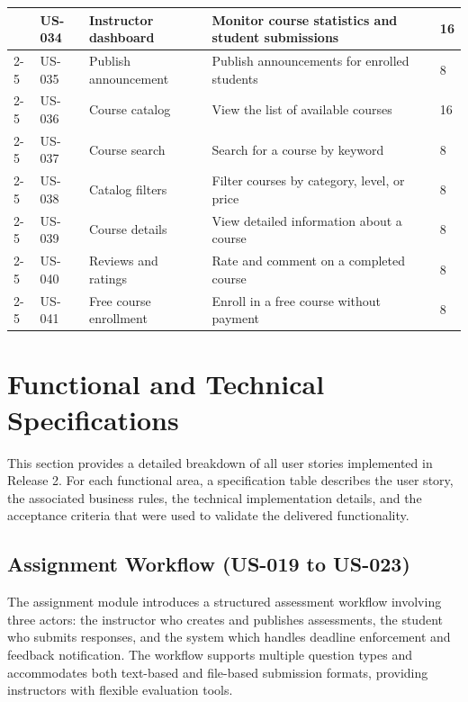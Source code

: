 \begin{table}[H]
\begin{tabularx}{\textwidth}{|p{1.4cm}|p{1.5cm}|p{2.8cm}|p{6.8cm}|p{1.5cm}|}
  & US-034 & Instructor dashboard & Monitor course statistics and student submissions & 16 \\
  \cline{2-5}
  & US-035 & Publish announcement & Publish announcements for enrolled students & 8 \\
  \cline{2-5}
  & US-036 & Course catalog & View the list of available courses & 16 \\
  \cline{2-5}
  & US-037 & Course search & Search for a course by keyword & 8 \\
  \cline{2-5}
  & US-038 & Catalog filters & Filter courses by category, level, or price & 8 \\
  \cline{2-5}
  & US-039 & Course details & View detailed information about a course & 8 \\
  \cline{2-5}
  & US-040 & Reviews and ratings & Rate and comment on a completed course & 8 \\
  \cline{2-5}
  & US-041 & Free course enrollment & Enroll in a free course without payment & 8 \\
\hline
\end{tabularx}
\end{table}

\section{Functional and Technical Specifications}

This section provides a detailed breakdown of all user stories implemented in Release 2.
For each functional area, a specification table describes the user story, the associated
business rules, the technical implementation details, and the acceptance criteria that
were used to validate the delivered functionality.

\subsection{Assignment Workflow (US-019 to US-023)}

The assignment module introduces a structured assessment workflow involving three
actors: the instructor who creates and publishes assessments, the student who submits
responses, and the system which handles deadline enforcement and feedback notification.
The workflow supports multiple question types and accommodates both text-based and
file-based submission formats, providing instructors with flexible evaluation tools.

